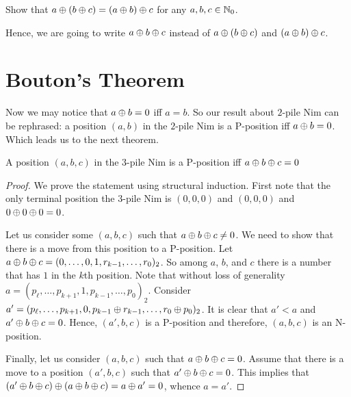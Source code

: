 \begin{exercise}
  Show that $a \oplus (b \oplus c) = (a \oplus b) \oplus c$
  for any $a, b, c \in {\mathbb{N}}_0$.
\end{exercise}
Hence, we are going to write $a \oplus b \oplus c$ instead of
$a \oplus (b \oplus c)$ and $(a \oplus b) \oplus c$.

\section{Bouton's Theorem}

Now we may notice that $a \oplus b = 0$ iff $a = b$. So
our result about $2$-pile Nim can be rephrased:
a position $(a, b)$ in the $2$-pile Nim is a P-position iff
$a \oplus b = 0$. Which leads us to the next theorem.
\begin{theorem}[Bouton]
\label{theorem:bouton}
  A position $(a, b, c)$ in the $3$-pile Nim is a P-position iff
  $a \oplus b \oplus c = 0$
\end{theorem}
\begin{proof}
  We prove the statement using structural induction.
  First note that the only terminal position the $3$-pile Nim is $(0, 0, 0)$
  and $(0, 0, 0)$ and $0 \oplus 0 \oplus 0 = 0$.

  Let us consider
  some $(a, b, c)$ such that $a \oplus b \oplus c \neq 0$.
  We need to show that there is a move from this position to a P-position.
  Let $a \oplus b \oplus c =
      (0, \dots, 0, 1, r_{k - 1}, \dots, r_0)_2$. So among $a$, $b$, and $c$
  there is a number that has $1$ in the $k$th position.
  Note that without loss of generality
  $a = (p_\ell, \dots, p_{k + 1}, 1, p_{k - 1}, \dots, p_0)_2$.
  Consider $a' = (p_\ell, \dots, p_{k + 1}, 0,
    p_{k - 1} \oplus r_{k - 1}, \dots, r_0 \oplus p_0)_2$. It is clear that
  $a' < a$ and $a' \oplus b \oplus c = 0$.
  Hence, $(a', b, c)$ is a P-position and therefore, $(a, b, c)$ is an
  N-position.

  Finally, let us consider $(a, b, c)$ such that
  $a \oplus b \oplus c = 0$. Assume that there is a move to a
  position $(a', b, c)$ such that $a' \oplus b \oplus c = 0$.
  This implies that
  $(a' \oplus b \oplus c) \oplus
      (a \oplus b \oplus c) =  a \oplus a' = 0$, whence $a = a'$.
\end{proof}
